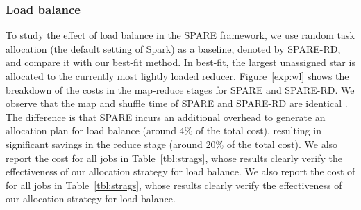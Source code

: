 \vspace{-2mm}
\subsubsection{Load balance}
To study the effect of load balance in the SPARE framework, we use random task allocation (the default setting of Spark) as a baseline, denoted by SPARE-RD, and compare it with our best-fit method. In best-fit, the largest unassigned star is allocated to the currently most lightly loaded reducer.
Figure~\ref{exp:wl} shows the breakdown of the costs in the map-reduce stages 
for SPARE and SPARE-RD. %
We observe that the map and shuffle time of SPARE and SPARE-RD are identical . The difference is that SPARE incurs an additional overhead to generate an allocation plan for load balance (around $4\%$ of the total cost), resulting in significant savings in the reduce stage (around $20\%$ of the total cost). 
We also report the cost  for all jobs in Table~\ref{tbl:strags}, whose results clearly verify the effectiveness of our allocation strategy for load balance.
We also report the cost of 
for all jobs in Table~\ref{tbl:strags}, whose results clearly verify the effectiveness of our allocation strategy for load balance.

